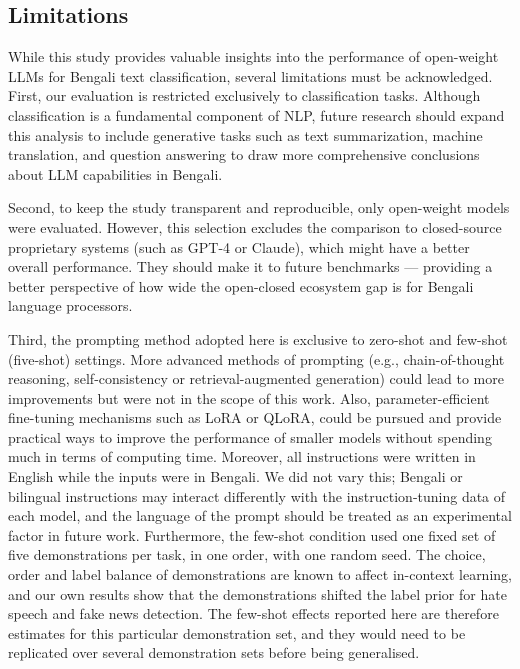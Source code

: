 \documentclass[10pt,letterpaper]{article}
\begin{document}
\subsection*{Limitations}

While this study provides valuable insights into the performance of open-weight LLMs for Bengali text classification, several limitations must be acknowledged. First, our evaluation is restricted exclusively to classification tasks. Although classification is a fundamental component of NLP, future research should expand this analysis to include generative tasks such as text summarization, machine translation, and question answering to draw more comprehensive conclusions about LLM capabilities in Bengali.

Second, to keep the study transparent and reproducible, only open-weight models were evaluated. However, this selection excludes the comparison to closed-source proprietary systems (such as GPT-4 or Claude), which might have a better overall performance. They should make it to future benchmarks — providing a better perspective of how wide the open-closed ecosystem gap is for Bengali language processors.

Third, the prompting method adopted here is exclusive to zero-shot and few-shot (five-shot) settings. More advanced methods of prompting (e.g., chain-of-thought reasoning, self-consistency or retrieval-augmented generation) could lead to more improvements but were not in the scope of this work. Also, parameter-efficient fine-tuning mechanisms such as LoRA or QLoRA, could be pursued and provide practical ways to improve the performance of smaller models without spending much in terms of computing time. Moreover, all instructions were written in English while the inputs were in Bengali. We did not vary this; Bengali or bilingual instructions may interact differently with the instruction-tuning data of each model, and the language of the prompt should be treated as an experimental factor in future work. Furthermore, the few-shot condition used one fixed set of five demonstrations per task, in one order, with one random seed. The choice, order and label balance of demonstrations are known to affect in-context learning, and our own results show that the demonstrations shifted the label prior for hate speech and fake news detection. The few-shot effects reported here are therefore estimates for this particular demonstration set, and they would need to be replicated over several demonstration sets before being generalised.
\end{document}
